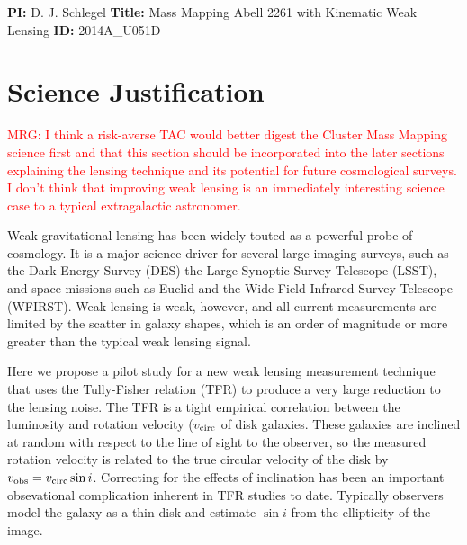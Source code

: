 \documentclass[12pt]{article}
\begin{document}
\textbf{PI:} D. J. Schlegel \textbf{Title:} Mass Mapping Abell 2261 with Kinematic Weak Lensing \textbf{ID:} 2014A\_U051D

\section{Science Justification}

\textcolor{Red}{MRG: I think a risk-averse TAC would better digest the Cluster Mass Mapping science first and that this section should be incorporated into the later sections explaining the lensing technique and its potential for future cosmological surveys. I don't think that improving weak lensing is an immediately interesting science case to a typical extragalactic astronomer.}

 Weak gravitational lensing has been widely touted as a powerful probe of cosmology. It is a major science driver for several large imaging surveys, such as the Dark Energy Survey (DES) the Large Synoptic Survey Telescope (LSST), and space missions such as Euclid and the Wide-Field Infrared Survey Telescope (WFIRST). Weak lensing is weak, however, and all current measurements are limited by the scatter in galaxy shapes, which is an order of magnitude or more greater than the typical weak lensing signal. 

Here we propose a pilot study for a new weak lensing measurement technique that uses the Tully-Fisher relation (TFR) to produce a very large reduction to the lensing noise. The TFR is a tight empirical correlation between the luminosity and rotation velocity ($v_{\rm circ}$ of disk galaxies. These galaxies are inclined at random with respect to the line of sight to the observer, so the measured rotation velocity is related to the true circular velocity of the disk by $v_{\rm obs} = v_{\rm circ} \sin i$. Correcting for the effects of inclination has been an important obsevational complication inherent in TFR studies to date. Typically observers model the galaxy as a thin disk and estimate $\sin i$ from the ellipticity of the image.
\end{document}
